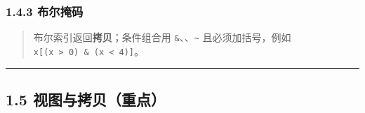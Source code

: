 \begin{Shaded}
\begin{Highlighting}[]
\NormalTok{[ 1 11]}
\NormalTok{[[ 1  3]}
\NormalTok{ [ 9 11]]}
\end{Highlighting}
\end{Shaded}

\subsubsection{1.4.3 布尔掩码}\label{ux5e03ux5c14ux63a9ux7801}

\begin{Shaded}
\begin{Highlighting}[]
\OperatorTok{=}\NormalTok{ np.array([}\NormalTok{, }\OperatorTok{{-}}\NormalTok{, }\NormalTok{, }\OperatorTok{{-}}\NormalTok{, }\NormalTok{])}
\OperatorTok{=}\OperatorTok{\textgreater{}} 
\CommentTok{\# [1 3 5]}
\OperatorTok{\textgreater{}} \NormalTok{))   }
\end{Highlighting}
\end{Shaded}

\begin{quote}
布尔索引返回\textbf{拷贝}；条件组合用
\texttt{\&}、\texttt{\textbar{}}、\texttt{\textasciitilde{}}
且必须加括号，例如
\texttt{x{[}(x\ \textgreater{}\ 0)\ \&\ (x\ \textless{}\ 4){]}}。
\end{quote}

\begin{center}\rule{0.5\linewidth}{0.5pt}\end{center}

\subsection{1.5
视图与拷贝（重点）}\label{ux89c6ux56feux4e0eux62f7ux8d1dux91cdux70b9}

